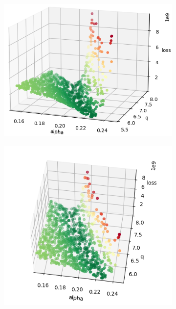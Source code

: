 \begin{figure}
	\centering
	\begin{subfigure}[b]{0.4\textwidth}
		\centering
		\includegraphics[width=\textwidth]{./figures/sensitivity/sensitivity_zoom1_0_2.png}	
	\end{subfigure}
	\begin{subfigure}[b]{0.4\textwidth}
		\centering
		\includegraphics[width=\textwidth]{./figures/sensitivity/sensitivity_zoom1_1_2.png}	

\end{subfigure}
\end{figure}

